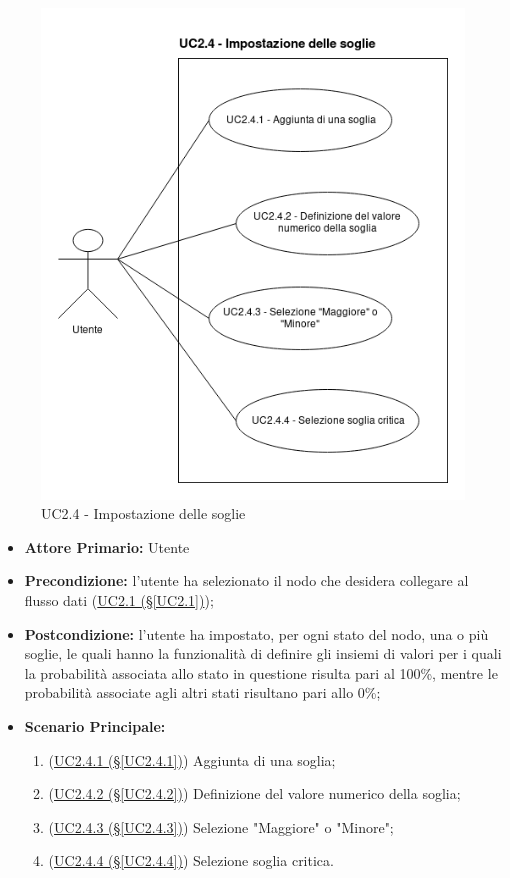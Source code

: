 \begin{figure}[H]
\centering
\includegraphics[scale=0.5]{./images/UC2-4.png}
\caption{UC2.4 - Impostazione delle soglie}
\end{figure}

\begin{itemize}
\item \textbf{Attore Primario:} Utente
\item \textbf{Precondizione:} l'utente ha selezionato il nodo che desidera collegare al flusso dati 					(\hyperref[UC2.1]{UC2.1 (§\ref*{UC2.1})});
\item \textbf{Postcondizione:} l'utente ha impostato, per ogni stato del nodo, una o più soglie, le quali hanno la funzionalità di definire gli insiemi di valori per i quali la probabilità associata allo stato in questione risulta pari al 100\%, mentre le probabilità associate agli altri stati risultano pari allo 0\%;
\item \textbf{Scenario Principale:}
	\begin{enumerate}
	\item (\hyperref[UC2.4.1]{UC2.4.1 (§\ref*{UC2.4.1})}) Aggiunta di una soglia;
	\item (\hyperref[UC2.4.2]{UC2.4.2 (§\ref*{UC2.4.2})}) Definizione del valore numerico della soglia;
	\item (\hyperref[UC2.4.3]{UC2.4.3 (§\ref*{UC2.4.3})}) Selezione "Maggiore" o "Minore";
	\item (\hyperref[UC2.4.4]{UC2.4.4 (§\ref*{UC2.4.4})}) Selezione soglia critica.
	\end{enumerate}
\end{itemize}

